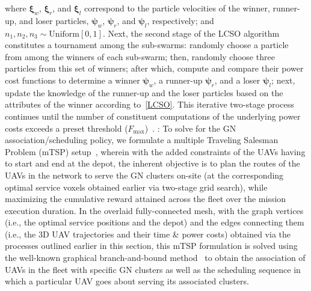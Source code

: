 \documentclass[10pt, twocolumn]{IEEEtran}
\begin{document}
where $\boldsymbol{\xi}_{w}$, $\boldsymbol{\xi}_{r}$, and $\boldsymbol{\xi}_{l}$ correspond to the particle velocities of the winner, runner-up, and loser particles, $\boldsymbol{\psi}_{w}$, $\boldsymbol{\psi}_{r}$, and $\boldsymbol{\psi}_{l}$, respectively; and $n_{1},n_{2},n_{3}{\sim}\mathrm{Uniform}[0,1]$. Next, the second stage of the LCSO algorithm constitutes a tournament among the sub-swarms: randomly choose a particle from among the winners of each sub-swarm; then, randomly choose three particles from this set of winners; after which, compute and compare their power cost functions to determine a winner $\boldsymbol{\psi}_{w}$, a runner-up $\boldsymbol{\psi}_{r}$, and a loser $\boldsymbol{\psi}_{l}$; next, update the knowledge of the runner-up and the loser particles based on the attributes of the winner according to~\eqref{LCSO}. This iterative two-stage process continues until the number of constituent computations of the underlying power costs exceeds a preset threshold ($F_{\mathrm{max}}$)~\cite{LCSO}.
: To solve for the GN association/scheduling policy, we formulate a multiple Traveling Salesman Problem (mTSP) setup~\cite{mTSP_Branch_and_Bound}, wherein with the added constraints of the UAVs having to start and end at the depot, the inherent objective is to plan the routes of the UAVs in the network to serve the GN clusters on-site (at the corresponding optimal service voxels obtained earlier via two-stage grid search), while maximizing the cumulative reward attained across the fleet over the mission execution duration. In the overlaid fully-connected mesh, with the graph vertices (i.e., the optimal service positions and the depot) and the edges connecting them (i.e., the $3$D UAV trajectories and their time \& power costs) obtained via the processes outlined earlier in this section, this mTSP formulation is solved using the well-known graphical branch-and-bound method~\cite{mTSP_Branch_and_Bound} to obtain the association of UAVs in the fleet with specific GN clusters as well as the scheduling sequence in which a particular UAV goes about serving its associated clusters.
\vspace{-3mm}

\end{document}
